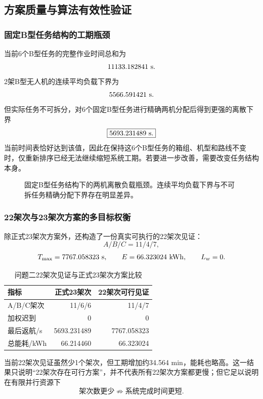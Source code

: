\documentclass[UTF8,a4paper,12pt]{ctexart}
\begin{document}
\subsection{方案质量与算法有效性验证}

\subsubsection{固定B型任务结构的工期瓶颈}

当前6个B型任务的完整作业时间总和为
\[
11133.182841\ {\rm s}.
\]
2架B型无人机的连续平均负载下界为
\[
5566.591421\ {\rm s}.
\]
但实际任务不可拆分，对6个固定B型任务进行精确两机分配后得到更强的离散下界
\[
\boxed{
5693.231489\ {\rm s}.
}
\]
当前时间表恰好达到该值，因此在保持这6个B型任务的箱组、机型和路线不变时，仅重新排序已经无法继续缩短系统工期。若要进一步改善，需要改变任务结构本身。

\begin{figure}[H]
  \centering
  \resizebox{0.84\textwidth}{!}{\QTwoFigBBottleneck}
  \caption{固定B型任务结构下的两机离散负载瓶颈。连续平均负载下界与不可拆任务精确分配下界存在明显差异。}
  \label{fig:q2_B_bottleneck_v7}
\end{figure}

\subsubsection{22架次与23架次方案的多目标权衡}

除正式23架次方案外，还构造了一份真实可执行的22架次见证：
\[
A/B/C=11/4/7,
\]
\[
T_{\max}=7767.058323\ {\rm s},
\qquad
E=66.323024\ {\rm kWh},
\qquad
L_w=0.
\]

\begin{table}[H]
\centering
\caption{问题二22架次见证与正式23架次方案比较}
\label{tab:q2_22_23_compare}
\begin{tabular}{lrr}
\toprule
指标 & 正式23架次 & 22架次可行见证\\
\midrule
A/B/C架次 & 11/6/6 & 11/4/7\\
加权迟到 & 0 & 0\\
最后返航/s & 5693.231489 & 7767.058323\\
总能耗/kWh & 66.214460 & 66.323024\\
\bottomrule
\end{tabular}
\end{table}

当前22架次见证虽然少1个架次，但工期增加约34.564 min，能耗也略高。这一结果只说明“22架次存在可行方案”，并不代表所有22架次方案都更慢；但它足以说明在有限并行资源下
\[
\boxed{
\text{架次数更少}
\not\Rightarrow
\text{系统完成时间更短}.
}
\]
\end{document}
